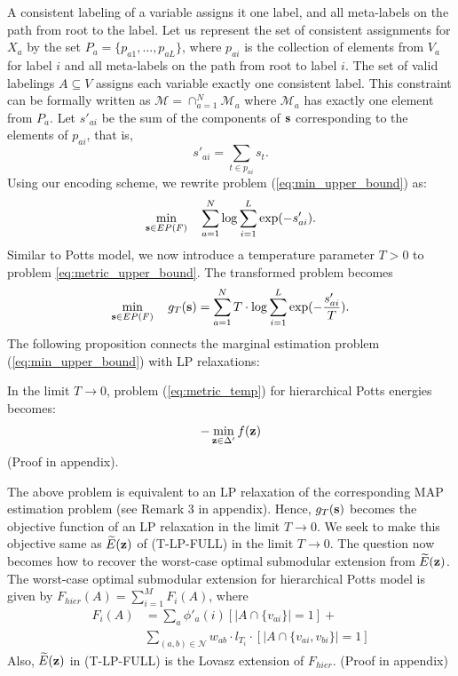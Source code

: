 A consistent labeling of a variable assigns it one label, and all meta-labels on the path from root to the label. Let us represent the set of consistent assignments for $X_a$ by the set $P_a = \{p_{a1}, \dots, p_{aL}\}$, where $p_{ai}$ is the collection of elements from $V_a$ for label $i$ and all meta-labels on the path from root to label $i$. The set of valid labelings $A \subseteq V$ assigns each variable exactly one consistent label. This constraint can be formally written as $\mathcal{M} = \cap_{a = 1}^{N} \mathcal{M}_a$ where $\mathcal{M}_a$ has exactly one element from $P_a$. Let $s'_{ai}$ be the sum of the components of $\bf s$ corresponding to the elements
of $p_{ai}$, that is, 
\begin{equation}
s'_{ai} = \sum_{t \in p_{ai}} s_t.
\label{eq:tree_s}
\end{equation}
Using our encoding scheme, we rewrite problem (\ref{eq:min_upper_bound}) as:
\begin{equation}
\min_{{\bf s} \in EP(F)} \quad \sum_{a = 1}^{N} \log \sum_{i = 1}^L \exp(-s'_{ai}).
\label{eq:metric_upper_bound}
\end{equation}
%
 Similar to Potts model, we now introduce a temperature parameter $T > 0$ to problem \eqref{eq:metric_upper_bound}. The transformed problem becomes
\begin{equation}
    \min_{{\bf s} \in EP(F)} \quad g_T ({\bf s}) = \sum_{a = 1}^{N} T \cdot \log \sum_{i = 1}^L \exp(-\frac{s'_{ai}}{T}).
\label{eq:metric_temp}
\end{equation}
 The following proposition connects the marginal estimation problem (\ref{eq:min_upper_bound}) with LP relaxations:

{\proposition In the limit $T \to 0$, problem (\ref{eq:metric_temp}) for hierarchical Potts energies becomes:
\begin{align}
    - \min_{{\bf z} \in \Delta'} f({\bf z}) 
\end{align}
\label{proposition:metric_equiv}}
(Proof in appendix).

The above problem is equivalent to an LP relaxation of the corresponding MAP
estimation problem (see Remark 3 in appendix). Hence, $g_T ({\bf s})$ becomes the objective function of an LP relaxation in the limit $T \to 0$. We seek to make this objective same as $\widetilde{E}({\bf z})$ of (T-LP-FULL) in the limit $T \to 0$. The question now becomes how to recover the  worst-case optimal submodular extension from $\widetilde{E}({\bf z})$.
%
{\proposition The  worst-case optimal submodular extension for hierarchical Potts model is given by $F_{hier}(A) = \sum_{i = 1}^M F_i(A)$, where
\begin{align}
    F_i(A) &= \sum_a \phi'_{a}(i) [|A \cap \{v_{ai}\}| = 1] + \nonumber \\
           &\sum_{(a, b) \in {\mathcal N}} {w_{ab}} \cdot l_{T_i} \cdot [|A \cap \{v_{ai}, v_{bi}\}| = 1]
\end{align}
Also, $\widetilde{E}({\bf z})$ in (T-LP-FULL) is the Lovasz extension of $F_{hier}$.
\label{proposition:rhst_worst-case optimal}}
(Proof in appendix)

